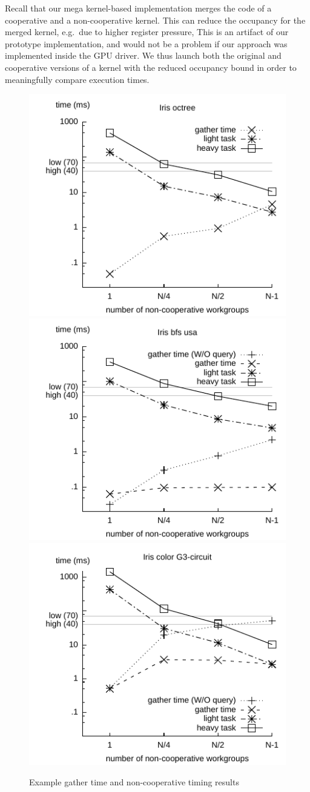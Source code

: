 \documentclass[sigconf]{acmart}
\begin{document}
{Recall that our mega kernel-based implementation merges the code of a
cooperative and a non-cooperative kernel.
This can reduce the occupancy for the merged kernel, e.g.\ due to
higher register pressure, This is an artifact of our prototype
implementation, and would not be a problem if our approach was
implemented inside the GPU driver.  We thus launch both the original
and cooperative versions of a kernel with the reduced occupancy bound
in order to meaningfully compare execution times.

\begin{figure}
\includegraphics[width=.67\columnwidth]{iris_octree_NA.pdf}
\includegraphics[width=.67\columnwidth]{iris_bfs_usa.pdf}
\includegraphics[width=.67\columnwidth]{iris_color_G3_circuit.pdf}
\caption{Example gather time and non-cooperative timing results}\label{fig:fine-grained-timing}
\end{figure}


}
\end{document}

